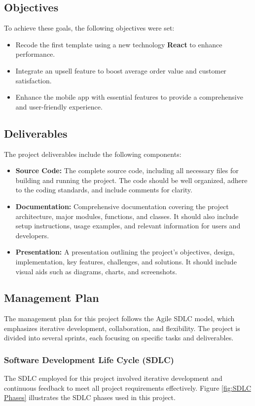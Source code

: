 \subsection{Objectives}
To achieve these goals, the following objectives were set:
\begin{itemize}
    \item Recode the first template using a new technology \textbf{React} to enhance performance.
    \item Integrate an upsell feature to boost average order value and customer satisfaction.
    \item Enhance the mobile app with essential features to provide a comprehensive and user-friendly experience.
\end{itemize}

\subsection{Deliverables}
The project deliverables include the following components:
\begin{itemize}
    \item \textbf{Source Code:} The complete source code, including all necessary files for building and running the project. The code should be well organized, adhere to the coding standards, and include comments for clarity.
    \item \textbf{Documentation:} Comprehensive documentation covering the project architecture, major modules, functions, and classes. It should also include setup instructions, usage examples, and relevant information for users and developers.
    \item \textbf{Presentation:} A presentation outlining the project's objectives, design, implementation, key features, challenges, and solutions. It should include visual aids such as diagrams, charts, and screenshots.
\end{itemize}

\subsection{Management Plan}
The management plan for this project follows the Agile SDLC model, which emphasizes iterative development, collaboration, and flexibility. The project is divided into several sprints, each focusing on specific tasks and deliverables.

\subsubsection{Software Development Life Cycle (SDLC)}
The SDLC employed for this project involved iterative development and continuous feedback to meet all project requirements effectively. Figure \ref{fig:SDLC Phases} illustrates the SDLC phases used in this project.

